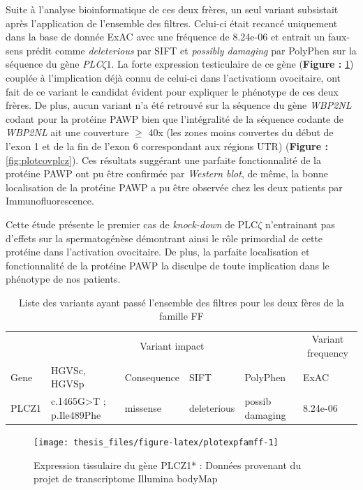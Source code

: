 \documentclass[12pt,twoside]{reedthesis}
\theoremstyle{definition}
\theoremstyle{definition}
\theoremstyle{remark}
\begin{document}
  Suite à l'analyse bioinformatique de ces deux frères, un seul variant
  subsistait après l'application de l'ensemble des filtres. Celui-ci était
  recancé uniquement dans la base de donnée ExAC avec une fréquence de
  8.24e-06 et entrait un faux-sens prédit comme \emph{deleterious} par
  SIFT et \emph{possibly damaging} par PolyPhen sur la séquence du gène
  \emph{PLC}\(\zeta 1\). La forte expression testiculaire de ce gène
  (\textbf{Figure : }\ref{fig:plotexpfamff}) couplée à l'implication déjà
  connu de celui-ci dans l'activationn ovocitaire, ont fait de ce variant
  le candidat évident pour expliquer le phénotype de ces deux frères. De
  plus, aucun variant n'a été retrouvé sur la séquence du gène
  \emph{WBP2NL} codant pour la protéine PAWP bien que l'intégralité de la
  séquence codante de \emph{WBP2NL} ait une couverture \(\ge\) 40x (les
  zones moins couvertes du début de l'exon 1 et de la fin de l'exon 6
  correspondant aux régions UTR) (\textbf{Figure :
  }\ref{fig:plotcovplcz}). Ces résultats suggérant une parfaite
  fonctionnalité de la protéine PAWP ont pu être confirmée par
  \emph{Western blot}, de même, la bonne localisation de la protéine PAWP
  a pu être observée chez les deux patients par Immunofluorescence.
  
  Cette étude présente le premier cas de \emph{knock-down} de PLC\(\zeta\)
  n'entrainant pas d'effets sur la spermatogénèse démontrant ainsi le rôle
  primordial de cette protéine dans l'activation ovocitaire. De plus, la
  parfaite localisation et fonctionnalité de la protéine PAWP la disculpe
  de toute implication dans le phénotype de nos patients.
  
  \begin{longtable}[t]{llllll}
  \caption{\label{tab:tabrecapff}Liste des variants ayant passé l'ensemble des filtres pour les deux fères de la famille FF}\\
  \toprule
  \multicolumn{1}{c}{ } & \multicolumn{4}{c}{Variant impact} & \multicolumn{1}{c}{Variant frequency} \\
  \cmidrule(l{2pt}r{2pt}){2-5} \cmidrule(l{2pt}r{2pt}){6-6}
  Gene & HGVSc, HGVSp & Consequence & SIFT & PolyPhen & ExAC\\
  \midrule
  PLCZ1 & c.1465G>T ; p.Ile489Phe & missense & deleterious & possib damaging & 8.24e-06\\
  \bottomrule
  \end{longtable}
  
  \newpage
  
  \begin{figure}
  
  {\centering \texttt{[image: thesis\_files/figure-latex/plotexpfamff-1]} 
  
  }
  
  \caption[Expression tissulaire du gène PLCZ1*]{Expression tissulaire du gène PLCZ1* : Données provenant du projet de transcriptome Illumina bodyMap}\label{fig:plotexpfamff}
  \end{figure}
  
\end{document}
